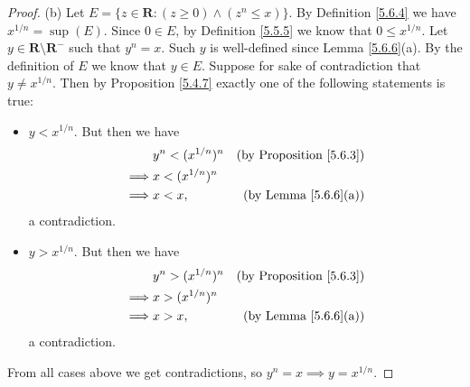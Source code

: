 \begin{proof}{(b)}
    Let \(E = \{z \in \mathbf{R} : (z \geq 0) \land (z^n \leq x)\}\).
    By Definition \ref{5.6.4} we have \(x^{1 / n} = \sup(E)\).
    Since \(0 \in E\), by Definition \ref{5.5.5} we know that \(0 \leq x^{1 / n}\).
    Let \(y \in \mathbf{R} \setminus \mathbf{R}^-\) such that \(y^n = x\).
    Such \(y\) is well-defined since Lemma \ref{5.6.6}(a).
    By the definition of \(E\) we know that \(y \in E\).
    Suppose for sake of contradiction that \(y \neq x^{1 / n}\).
    Then by Proposition \ref{5.4.7} exactly one of the following statements is true:
    \begin{itemize}
        \item \(y < x^{1 / n}\).
              But then we have
              \begin{align*}
                           & y^n < (x^{1 / n})^n & \text{(by Proposition \ref{5.6.3})} \\
                  \implies & x < (x^{1 / n})^n                                         \\
                  \implies & x < x,              & \text{(by Lemma \ref{5.6.6}(a))}
              \end{align*}
              a contradiction.
        \item \(y > x^{1 / n}\).
              But then we have
              \begin{align*}
                           & y^n > (x^{1 / n})^n & \text{(by Proposition \ref{5.6.3})} \\
                  \implies & x > (x^{1 / n})^n                                         \\
                  \implies & x > x,              & \text{(by Lemma \ref{5.6.6}(a))}
              \end{align*}
              a contradiction.
    \end{itemize}
    From all cases above we get contradictions, so \(y^n = x \implies y = x^{1 / n}\).
\end{proof}

